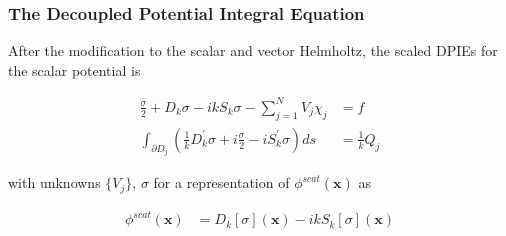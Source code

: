 \documentclass{beamer}
\newcommand{\bvec}[1]{\boldsymbol{#1}}
\begin{document}
	\begin{frame}
	\frametitle{The Decoupled Potential Integral Equation}
	After the modification to the scalar and vector Helmholtz, the scaled DPIEs for the scalar potential is
	
	\begin{align*}
	\frac{\sigma}{2} + D_{k}\sigma - i k S_k \sigma - \sum_{j=1}^N V_j \chi_j &= f \\
	\int_{\partial D_j} \left( \frac{1}{k} D_{k}^{'} \sigma + i \frac{\sigma}{2} - i S_k^{'}\sigma \right) ds &= \frac{1}{k}Q_j
	\end{align*}
	
	with unknowns $\lbrace V_j\rbrace$, $\sigma$ for a representation of $\phi^{scat}(\bvec{x})$ as
	
	\begin{align*}
	\phi^{scat}(\bvec{x}) &= D_k [\sigma](\bvec{x}) - i k S_k [\sigma] (\bvec{x})
	\end{align*}
	
	\end{frame}
\end{document}
